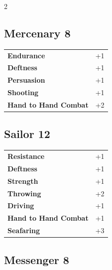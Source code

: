 \begin{multicols}{2}
\begin{tcolorbox}
    \subsection*{Mercenary \hfill \small{8 }}
    \tcblower




\begin{tabular}{@{}ll@{}}
    \textbf{Endurance} & +1\\
    \textbf{Deftness} & +1\\
    \textbf{Persuasion} & +1\\
    \textbf{Shooting} & +1\\
    \textbf{Hand to Hand Combat} & +2\\
\end{tabular}


\end{tcolorbox}

\begin{tcolorbox}
    \subsection*{Sailor \hfill \small{12 }}
    \tcblower




\begin{tabular}{@{}ll@{}}
    \textbf{Resistance} & +1\\
    \textbf{Deftness} & +1\\
    \textbf{Strength} & +1\\
    \textbf{Throwing} & +2\\
    \textbf{Driving} & +1\\
    \textbf{Hand to Hand Combat} & +1\\
    \textbf{Seafaring} & +3\\
\end{tabular}


\end{tcolorbox}

\begin{tcolorbox}
    \subsection*{Messenger \hfill \small{8 }}
    \tcblower





\end{tcolorbox}
\end{multicols}
